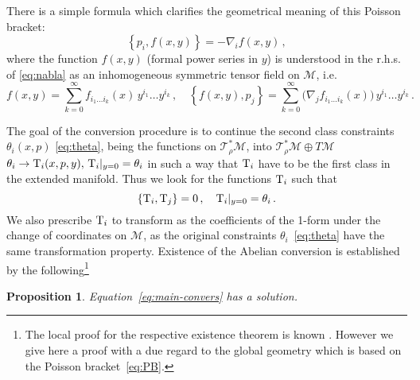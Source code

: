 \documentclass[a4paper,11pt,oneside]{amsart}
\theoremstyle{plain}
\numberwithin{equation}{section} %
\numberwithin{figure}{section} %
\newtheorem{fact}{Proposition}[section]
\newcommand{\pb}[2]{\left\{{}#1{},{}#2{}\right\}}
\def\cT{{\rm T}}
\def\mod{{\mathcal T}^*_\rho}
\def\manM{{\mathcal M}}
\begin{document}
\noindent
There is a simple formula which clarifies
the geometrical meaning of this Poisson bracket:
\begin{equation}
\pb{p_i}{f(x,y)} = - \nabla_i f(x,y)\,,
\label{eq:nabla}
\end{equation}
where the function $f(x,y)$ (formal power series in $y$)
is understood in the r.h.s.  of \eqref{eq:nabla} as an inhomogeneous
symmetric tensor field on $\manM$, i.e.
\begin{equation} f(x,y)=\sum^\infty_{k=0}
f_{i_1 \ldots i_k} (x) \, y^{i_1} \ldots y^{i_k} \, , \quad \pb{f(x,y)}{p_j}
= \sum^\infty_{k=0} \bigl( \nabla_j f_{i_1 \ldots i_k} (x) \bigr) \, y^{i_1}
\ldots y^{i_k}\,.
\end{equation}

\noindent
The goal of the conversion procedure is to continue
the second class constraints $\theta_i(x,p)$ \eqref{eq:theta},
being the functions on
$\mod\manM$, into   $\mod\manM \oplus T \manM$  \,
$\theta_i \to { \cT}_i (x,p,y), \, { \cT}_i|_{y=0}=\theta_i $
in such a way that ${\cT}_i$ have to be the first class
in the extended manifold.
Thus we look for the functions $\cT_i$ such that
\begin{equation}
\label{eq:main-convers}
\pb{\cT_i}{\cT_j}=0 \,, \quad
{\cT}_i|_{y=0}= {\theta}_i\,.
\end{equation}
We also prescribe $\cT_i$ to transform as the
coefficients of the 1-form
under the change of coordinates on $\manM$,
as the original constraints $\theta_i$~\eqref{eq:theta}
have the same transformation property.  Existence of the
Abelian conversion is established by the
following\footnote{The local proof for the respective
existence theorem is known \cite{[BT]}.
However we give here a proof with a due regard
to the global geometry which is based on the Poisson
bracket~\eqref{eq:PB}.}
\begin{fact}\label{fact:existence}
Equation~\eqref{eq:main-convers} has a solution.
\end{fact}
\end{document}
